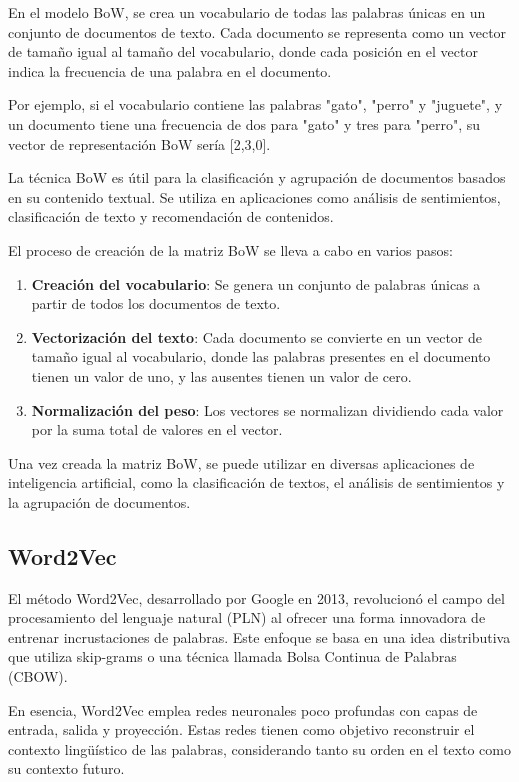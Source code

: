 En el modelo BoW, se crea un vocabulario de todas las palabras únicas en un conjunto de documentos de texto. Cada documento se representa como un vector de tamaño igual al tamaño del vocabulario, donde cada posición en el vector indica la frecuencia de una palabra en el documento.
	
Por ejemplo, si el vocabulario contiene las palabras "gato", "perro" y "juguete", y un documento tiene una frecuencia de dos para "gato" y tres para "perro", su vector de representación BoW sería [2,3,0].
	
La técnica BoW es útil para la clasificación y agrupación de documentos basados en su contenido textual. Se utiliza en aplicaciones como análisis de sentimientos, clasificación de texto y recomendación de contenidos.
	
El proceso de creación de la matriz BoW se lleva a cabo en varios pasos:
\begin{enumerate}
	\item \textbf{Creación del vocabulario}: Se genera un conjunto de palabras únicas a partir de todos los documentos de texto.
	\item \textbf{Vectorización del texto}: Cada documento se convierte en un vector de tamaño igual al vocabulario, donde las palabras presentes en el documento tienen un valor de uno, y las ausentes tienen un valor de cero.
	\item \textbf{Normalización del peso}: Los vectores se normalizan dividiendo cada valor por la suma total de valores en el vector.
\end{enumerate}

Una vez creada la matriz BoW, se puede utilizar en diversas aplicaciones de inteligencia artificial, como la clasificación de textos, el análisis de sentimientos y la agrupación de documentos.


\subsection{Word2Vec}
El método Word2Vec, desarrollado por Google en 2013, revolucionó el campo del procesamiento del lenguaje natural (PLN) al ofrecer una forma innovadora de entrenar incrustaciones de palabras. Este enfoque se basa en una idea distributiva que utiliza skip-grams o una técnica llamada Bolsa Continua de Palabras (CBOW).

En esencia, Word2Vec emplea redes neuronales poco profundas con capas de entrada, salida y proyección. Estas redes tienen como objetivo reconstruir el contexto lingüístico de las palabras, considerando tanto su orden en el texto como su contexto futuro.

